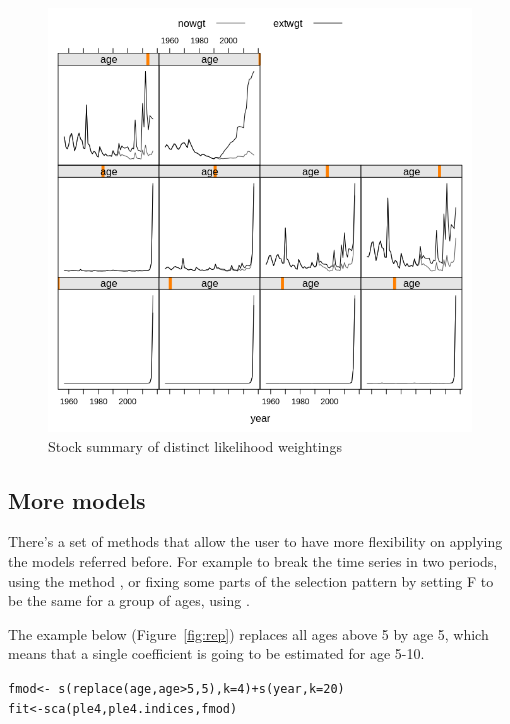 \documentclass[a4paper,english,10pt]{article}\usepackage[]{graphicx}\usepackage[]{color}
\makeatletter
\newcommand{\hlnum}[1]{\textcolor[rgb]{0.063,0.58,0.627}{#1}}%
\newcommand{\hlopt}[1]{\textcolor[rgb]{0.196,0.196,0.196}{#1}}%
\newcommand{\hlstd}[1]{\textcolor[rgb]{0.196,0.196,0.196}{#1}}%
\newcommand{\hlkwb}[1]{\textcolor[rgb]{0.627,0,0.314}{#1}}%
\newcommand{\hlkwc}[1]{\textcolor[rgb]{0,0.631,0.314}{#1}}%
\newcommand{\hlkwd}[1]{\textcolor[rgb]{0.78,0.227,0.412}{#1}}%
\newenvironment{kframe}{%
 \def\at@end@of@kframe{}%
 \ifinner\ifhmode%
  \def\at@end@of@kframe{\end{minipage}}%
  \begin{minipage}{\columnwidth}%
 \fi\fi%
 \def\FrameCommand##1{\hskip\@totalleftmargin \hskip-\fboxsep
 \colorbox{shadecolor}{##1}\hskip-\fboxsep
     \hskip-\linewidth \hskip-\@totalleftmargin \hskip\columnwidth}%
 \MakeFramed {\advance\hsize-\width
   \@totalleftmargin\z@ \linewidth\hsize
   \@setminipage}}%
 {\par\unskip\endMakeFramed%
 \at@end@of@kframe}
\newenvironment{knitrout}{}{} %
\makeatother
\begin{document}
\begin{knitrout}
\color{fgcolor}\begin{figure}[H]

{\centering \includegraphics[width=.9\linewidth]{figure/likwgt-1} 

}

\caption[Stock summary of distinct likelihood weightings]{Stock summary of distinct likelihood weightings}\label{fig:likwgt}
\end{figure}


\end{knitrout}

\subsection{More models}

There's a set of methods that allow the user to have more flexibility on applying the models referred before. For example to break the time series in two periods, using the method , or fixing some parts of the selection pattern by setting F to be the same for a group of ages, using .

The example below (Figure~\ref{fig:rep}) replaces all ages above 5 by age 5, which means that a single coefficient is going to be estimated for age 5-10.

\begin{knitrout}
\color{fgcolor}\begin{kframe}
\begin{alltt}
\hlstd{fmod} \hlkwb{<-} \hlopt{~}\hlkwd{s}\hlstd{(}\hlkwd{replace}\hlstd{(age, age} \hlopt{>} \hlnum{5}\hlstd{,} \hlnum{5}\hlstd{),} \hlkwc{k} \hlstd{=} \hlnum{4}\hlstd{)} \hlopt{+} \hlkwd{s}\hlstd{(year,} \hlkwc{k} \hlstd{=} \hlnum{20}\hlstd{)}
\hlstd{fit} \hlkwb{<-} \hlkwd{sca}\hlstd{(ple4, ple4.indices, fmod)}
\end{alltt}
\end{kframe}
\end{knitrout}
\end{document}

